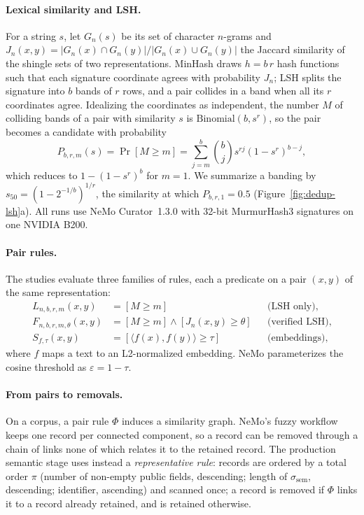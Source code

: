 \paragraph{Lexical similarity and LSH.} For a string $s$, let $G_n(s)$ be its
set of character $n$-grams and
$J_n(x,y)=|G_n(x)\cap G_n(y)|/|G_n(x)\cup G_n(y)|$ the Jaccard similarity of
the shingle sets of two representations. MinHash draws $h=b\,r$ hash functions
such that each signature coordinate agrees with probability $J_n$; LSH splits
the signature into $b$ bands of $r$ rows, and a pair collides in a band when
all its $r$ coordinates agree. Idealizing the coordinates as independent, the
number $M$ of colliding bands of a pair with similarity $s$ is
$\mathrm{Binomial}(b,s^r)$, so the pair becomes a candidate with probability
\begin{equation}
P_{b,r,m}(s)=\Pr[M\ge m]=\sum_{j=m}^{b}\binom{b}{j}s^{rj}(1-s^r)^{b-j},
\label{eq:dedup-lsh}
\end{equation}
which reduces to $1-(1-s^r)^b$ for $m=1$. We summarize a banding by
$s_{50}=(1-2^{-1/b})^{1/r}$, the similarity at which $P_{b,r,1}=0.5$
(Figure~\ref{fig:dedup-lsh}a). All runs use NeMo Curator~1.3.0 with 32-bit
MurmurHash3 signatures on one NVIDIA B200.

\paragraph{Pair rules.} The studies evaluate three families of rules, each a
predicate on a pair $(x,y)$ of the same representation:
\begin{align*}
L_{n,b,r,m}(x,y) &= [M \ge m] && \text{(LSH only)},\\
F_{n,b,r,m,\theta}(x,y) &= [M \ge m] \wedge [J_n(x,y) \ge \theta] && \text{(verified LSH)},\\
S_{f,\tau}(x,y) &= [\langle f(x), f(y)\rangle \ge \tau] && \text{(embeddings)},
\end{align*}
where $f$ maps a text to an L2-normalized embedding. NeMo parameterizes the
cosine threshold as $\varepsilon = 1-\tau$.

\paragraph{From pairs to removals.} On a corpus, a pair rule $\Phi$ induces
a similarity graph. NeMo's fuzzy workflow keeps one record per connected
component, so a record can be removed through a chain of links none of which
relates it to the retained record. The production semantic stage uses instead
a \emph{representative rule}: records are ordered by a total order $\pi$
(number of non-empty public fields, descending; length of
$\sigma_{\mathrm{sem}}$, descending; identifier, ascending) and scanned once;
a record is removed if $\Phi$ links it to a record already retained, and is
retained otherwise.

